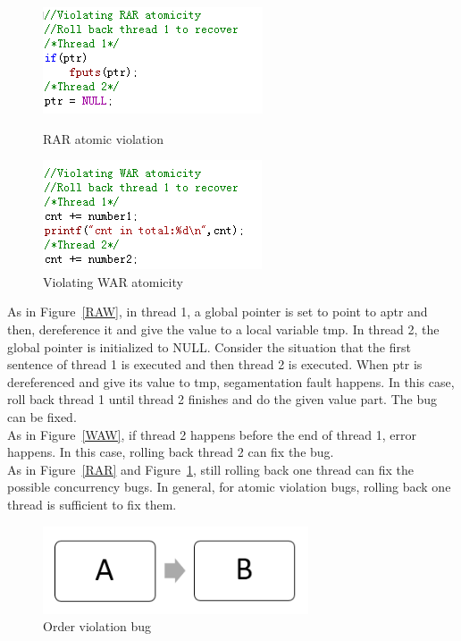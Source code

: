\begin{figure}
\begin{minipage}[t]{0.52\linewidth}
\centering
\includegraphics[width=\textwidth]{body/RAR.png}
\caption{RAR atomic violation}
\label {RAR}
\end{minipage}%
\begin{minipage}[t]{0.52\linewidth}
\centering
\includegraphics[width=\textwidth]{body/WAR.png}
\caption{Violating WAR atomicity}
\label{WAR}
\end{minipage}
\end{figure}
As in Figure~\ref{RAW}, in thread 1, a global pointer is set to point to aptr and then, dereference it and give the value to a local variable tmp. In thread 2, the global pointer is initialized to NULL. Consider the situation that the first sentence of thread 1 is executed and then thread 2 is executed. When ptr is dereferenced and give its value to tmp, segamentation fault happens. In this case, roll back thread 1 until thread 2 finishes and do the given value part. The bug can be fixed.\\
As in Figure~\ref{WAW}, if thread 2 happens before the end of thread 1, error happens. In this case, rolling back thread 2 can fix the bug.\\
As in Figure~\ref{RAR} and Figure~\ref{WAR}, still rolling back one thread can fix the possible concurrency bugs. In general, for atomic violation bugs, rolling back one thread is sufficient to fix them.
\begin{figure}[t]
\centering
\includegraphics[width=0.7\textwidth]{body/order_violation.png}
\caption{Order violation bug}
\label{order violation}
\end{figure}
